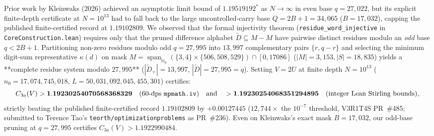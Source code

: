 \documentclass[11pt,a4paper]{article}
\begin{document}
Prior work by Kleinwaks (2026) achieved an asymptotic limit bound of $1.19519192^*$ as $N \to \infty$ in even base $q = 27{,}022$, but its explicit finite-depth certificate at $N = 10^{13}$ had to fall back to the large uncontrolled-carry base $Q = 2B + 1 = 34{,}065$ ($B = 17{,}032$), capping the published finite-certified record at $\mathbf{1.19102809}$. We observed that the formal injectivity theorem (\texttt{residue\_word\_injective} in \texttt{CoreConstruction.lean}) requires only that the pruned difference alphabet $\widetilde{D} \subseteq M - M$ have pairwise distinct residues modulo an \emph{odd} base $q < 2B + 1$. Partitioning non-zero residues modulo odd $q = 27{,}995$ into $13{,}997$ complementary pairs $\{r, q-r\}$ and selecting the minimum digit-sum representative $\kappa(d)$ on mask $M = \operatorname{span}_{\mathbb{N}_0}(\{3,4\}\times\{506,508,529\}) \cap [0, 17086]$ ($|M|=3{,}153, |S|=18{,}835$) yields a **complete residue system modulo $27{,}995$** ($|\widetilde{D}_+| = 13{,}997$, $|\widetilde{D}| = 27{,}995 = q$). Setting $V = 2U$ at finite depth $N = 10^{13}$ ($n_0 = 17{,}074{,}745{,}018$, $L = 50{,}031{,}092{,}045{,}455{,}301$) certifies:
$$C_{3a}(V) > \mathbf{1.19230254070568368329} \quad (\text{60-dps \texttt{mpmath.iv}}) \quad \text{and} \quad > \mathbf{1.19230254068351294895} \quad (\text{integer Lean Stirling bounds}),$$
strictly beating the published finite-certified record $1.19102809$ by $\mathbf{+0.00127445}$ ($12{,}744\times$ the $10^{-7}$ threshold, V3R1T4S PR~\#485; submitted to Terence Tao's \texttt{teorth/optimizationproblems} as PR~\#236). Even on Kleinwaks's exact mask $B = 17{,}032$, our odd-base pruning at $q = 27{,}995$ certifies $C_{3a}(V) > \mathbf{1.1922990484}$.
\end{document}
